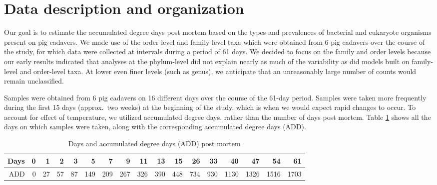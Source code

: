 \documentclass{article}
\begin{document}
\section{Data description and organization}

Our goal is to estimate the accumulated degree days post mortem based
on the types and prevalences of bacterial and eukaryote organisms
present on pig cadavers.  We made use of the order-level and
family-level taxa which were obtained from 6 pig cadavers over the
course of the study, for which data were collected at intervals during
a period of 61 days.  We decided to focus on the family and order
levels because our early results indicated that analyses at the
phylum-level did not explain nearly as much of the variability as did
models built on family-level and order-level taxa.  At lower even
finer levels (such as genus), we anticipate that an unreasonably large
number of counts would remain unclassified.

Samples were obtained from 6 pig cadavers on 16 different days over
the course of the 61-day period.  Samples were taken more frequently
during the first 15 days (approx.~two weeks) at the beginning of the
study, which is when we would expect rapid changes to occur.  To
account for effect of temperature, we utilized accumulated degree
days, rather than the number of days post mortem.  Table
\ref{tbl:degdays_vs_days} shows all the days on which samples were
taken, along with the corresponding accumulated degree days (ADD).
\begin{table}[hb]
  \centering
  \caption{\label{tbl:degdays_vs_days}Days and accumulated degree days
    (ADD) post mortem}
  \begin{tabular}{r|rrrrrrrrrrrrrrrr}
  Days & 0 & 1 & 2 & 3 & 5 & 7 & 9 & 11 & 13 & 15 & 26 & 33 & 40 & 47 & 54 & 61\\ \hline
  ADD & 0 & 27 & 57 & 87 & 149 & 209 & 267 & 326 & 390 & 448 & 734 & 930 & 1130 & 1326 & 1516 & 1703
  \end{tabular}
\end{table}
\end{document}
